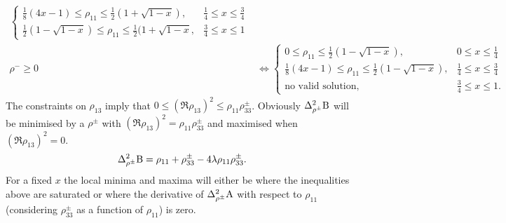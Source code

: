 \begin{subappendices}
\begin{align}
\begin{cases}
    \frac{1}{8}\left(4x-1\right)\leq \rho_{11}\leq \frac{1}{2}\left(1+\sqrt{1-x}\right), & \frac{1}{4}\leq x\leq \frac{3}{4}\\
    \frac{1}{2}\left(1-\sqrt{1-x}\right)\leq \rho_{11} \leq\frac{1}{2}(1+\sqrt{1-x}, & \frac{3}{4}\leq x\leq 1
  \end{cases}\\ 
  \rho^- \geq 0 &\iff \begin{cases}0\leq\rho_{11}\leq\frac{1}{2}(1-\sqrt{1-x}), &0\leq x\leq\frac{1}{4}\\
    \frac{1}{8}\left(4x-1\right)\leq\rho_{11}\leq\frac{1}{2}(1-\sqrt{1-x}), & \frac{1}{4}\leq x\leq \frac{3}{4}\\
    \text{no valid solution}, & \frac{3}{4}\leq x\leq 1.
  \end{cases}\label{eqn:rho-minus-constraints}
\end{align} %
The constraints on $\rho_{13}$ imply that $0\leq\left(\Re{\rho_{13}}\right)^2\leq\rho_{11}\rho_{33}^\pm$. Obviously $\var[\rho^\pm]{\opb}$ will be minimised by a $\rho^\pm$ with $\left(\Re{\rho_{13}}\right)^2 = \rho_{11}\rho_{33}^\pm$ and maximised when $\left(\Re{\rho_{13}}\right)^2 = 0$.
\begin{align}
  \var[\rho^\pm]{\opb} = \rho_{11} +\rho_{33}^\pm - 4\lambda\rho_{11}\rho_{33}^\pm.
\end{align}
For a fixed $x$ the local minima and maxima will either be where the inequalities above are saturated or where the derivative of $\var[\rho^\pm]{\opa}$ with respect to $\rho_{11}$ (considering $\rho_{33}^\pm$ as a function of $\rho_{11}$) is zero. 


\end{subappendices}
